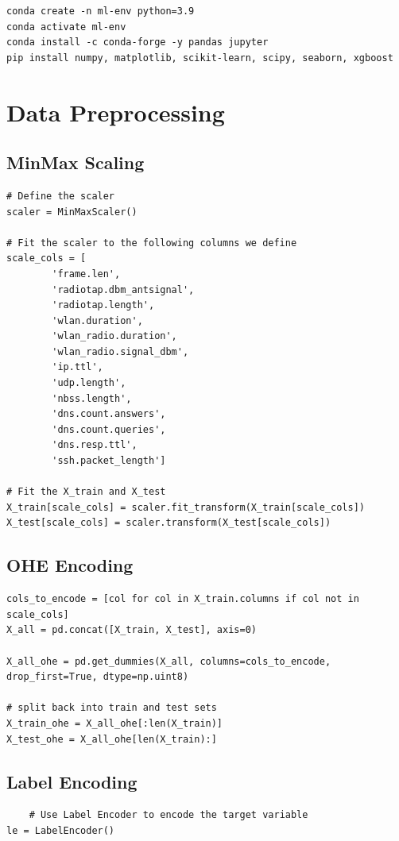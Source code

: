 \begin{appendices}
\begin{lstlisting}
conda create -n ml-env python=3.9
conda activate ml-env
conda install -c conda-forge -y pandas jupyter
pip install numpy, matplotlib, scikit-learn, scipy, seaborn, xgboost
\end{lstlisting}

\newpage

\section{Data Preprocessing}
\label{appx:Data Processing}

\subsection{MinMax Scaling}
\label{appx:Scaling}

\begin{lstlisting}
# Define the scaler
scaler = MinMaxScaler()

# Fit the scaler to the following columns we define
scale_cols = [
        'frame.len',
        'radiotap.dbm_antsignal', 
        'radiotap.length', 
        'wlan.duration', 
        'wlan_radio.duration', 
        'wlan_radio.signal_dbm',
        'ip.ttl', 
        'udp.length', 
        'nbss.length',
        'dns.count.answers', 
        'dns.count.queries',
        'dns.resp.ttl',
        'ssh.packet_length']
        
# Fit the X_train and X_test
X_train[scale_cols] = scaler.fit_transform(X_train[scale_cols])
X_test[scale_cols] = scaler.transform(X_test[scale_cols])
\end{lstlisting}

\subsection{OHE Encoding}
\label{appx:OHE Encoding}
\begin{lstlisting}
cols_to_encode = [col for col in X_train.columns if col not in scale_cols]
X_all = pd.concat([X_train, X_test], axis=0)

X_all_ohe = pd.get_dummies(X_all, columns=cols_to_encode, drop_first=True, dtype=np.uint8)

# split back into train and test sets
X_train_ohe = X_all_ohe[:len(X_train)]
X_test_ohe = X_all_ohe[len(X_train):]
\end{lstlisting}

\newpage
\subsection{Label Encoding}
\label{appx:Label Encoding}
\begin{lstlisting}
    # Use Label Encoder to encode the target variable
le = LabelEncoder()


\end{lstlisting}
\end{appendices}
